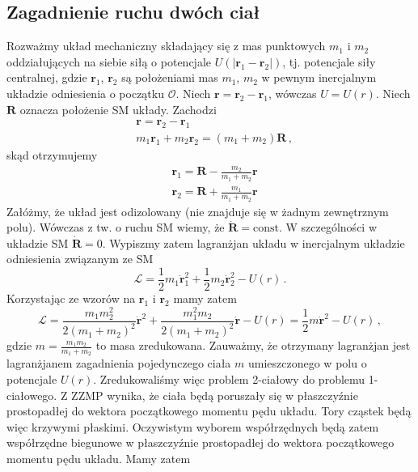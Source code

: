 \documentclass[../main.tex]{subfiles}
\begin{document}
\subsection{Zagadnienie ruchu dwóch ciał}
Rozważmy układ mechaniczny składający się z mas punktowych \(m_1\) i \(m_2\) oddziałujących na siebie siłą o potencjale \(U(|\mathbf{r}_1-\mathbf{r}_2|)\), tj. potencjale siły centralnej, gdzie \(\mathbf{r}_1\), \(\mathbf{r}_2\) są położeniami mas \(m_1\), \(m_2\) w pewnym inercjalnym układzie odniesienia o początku \(\mathcal{O}\). Niech \(\mathbf{r}=\mathbf{r}_2-\mathbf{r}_1\), wówczas \(U=U(r)\). Niech \(\mathbf{R}\) oznacza położenie SM układy. Zachodzi
\begin{equation*}
\begin{split}
    &\mathbf{r}=\mathbf{r}_2-\mathbf{r}_1\\
    &m_1\mathbf{r}_1+m_2\mathbf{r}_2=(m_1+m_2)\mathbf{R}\,,
\end{split}
\end{equation*}
skąd otrzymujemy
\begin{equation*}
\begin{split}
    &\mathbf{r}_1=\mathbf{R}-\frac{m_2}{m_1+m_2}\mathbf{r}\\
    &\mathbf{r}_2=\mathbf{R}+\frac{m_1}{m_1+m_2}\mathbf{r}
\end{split}
\end{equation*}
Załóżmy, że układ jest odizolowany (nie znajduje się w żadnym zewnętrznym polu). Wówczas z tw. o ruchu SM wiemy, że \(\dot{\mathbf{R}}=\text{const}\). W szczególności w układzie SM \(\dot{\mathbf{R}}=0\). Wypiszmy zatem lagranżjan układu w inercjalnym układzie odniesienia związanym ze SM
\begin{equation*}
    \mathcal{L}=\frac{1}{2}m_1\dot{\mathbf{r}}_1^2+\frac{1}{2}m_2\dot{\mathbf{r}}_2^2-U(r)\,.
\end{equation*}
Korzystając ze wzorów na \(\mathbf{r}_1\) i \(\mathbf{r}_2\) mamy zatem
\begin{equation*}
    \mathcal{L}=\frac{m_1m_2^2}{2(m_1+m_2)^2}\dot{\mathbf{r}}^2+\frac{m_1^2m_2}{2(m_1+m_2)^2}\dot{\mathbf{r}}-U(r)=\frac{1}{2}m\dot{\mathbf{r}}^2-U(r)\,,
\end{equation*}
gdzie \(m=\frac{m_1m_2}{m_1+m_2}\) to masa zredukowana. Zauważmy, że otrzymany lagranżjan jest lagranżjanem zagadnienia pojedynczego ciała \(m\) umieszczonego w polu o potencjale \(U(r)\). Zredukowaliśmy więc problem 2-ciałowy do problemu 1-ciałowego. Z ZZMP wynika, że ciała będą poruszały się w płaszczyźnie prostopadłej do wektora początkowego momentu pędu układu. Tory cząstek będą więc krzywymi płaskimi. Oczywistym wyborem współrzędnych będą zatem współrzędne biegunowe w płaszczyźnie prostopadłej do wektora początkowego momentu pędu układu. Mamy zatem
\end{document}
